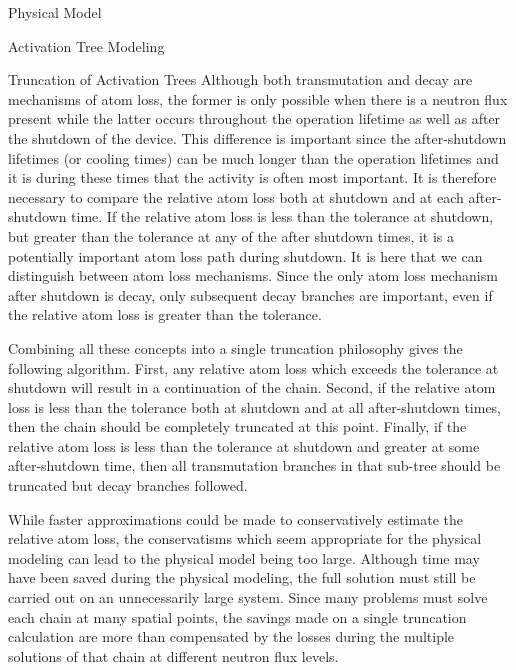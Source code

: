 \begin{chapter}{Physical Model\label{chap:physical}}
\begin{section}{Activation Tree Modeling\label{sec:physical.chains}}
\begin{subsection}{Truncation of Activation Trees\label{sec:physical.chains.trunc}}
    Although both transmutation and decay are mechanisms of atom loss,
    the former is only possible when there is a neutron flux present
    while the latter occurs throughout the operation lifetime as well
    as after the shutdown of the device.  This difference is important
    since the after-shutdown lifetimes (or cooling times) can be much
    longer than the operation lifetimes and it is during these times
    that the activity is often most important.  It is therefore
    necessary to compare the relative atom loss both at shutdown and
    at each after-shutdown time.  If the relative atom loss is less
    than the tolerance at shutdown, but greater than the tolerance at
    any of the after shutdown times, it is a potentially important
    atom loss path during shutdown.  It is here that we can
    distinguish between atom loss mechanisms.  Since the only atom
    loss mechanism after shutdown is decay, only subsequent decay
    branches are important, even if the relative atom loss is greater
    than the tolerance.
    
    Combining all these concepts into a single truncation philosophy
    gives the following algorithm.  First, any relative atom loss
    which exceeds the tolerance at shutdown will result in a
    continuation of the chain.  Second, if the relative atom loss is
    less than the tolerance both at shutdown and at all after-shutdown
    times, then the chain should be completely truncated at this
    point.  Finally, if the relative atom loss is less than the
    tolerance at shutdown and greater at some after-shutdown time,
    then all transmutation branches in that sub-tree should be
    truncated but decay branches followed.
    
    While faster approximations could be made to conservatively
    estimate the relative atom loss, the conservatisms which seem
    appropriate for the physical modeling can lead to the physical
    model being too large.  Although time may have been saved during
    the physical modeling, the full solution must still be carried out
    on an unnecessarily large system.  Since many problems must solve
    each chain at many spatial points, the savings made on a single
    truncation calculation are more than compensated by the losses
    during the multiple solutions of that chain at different neutron
    flux levels.
    

\end{subsection}
\end{section}
\end{chapter}
